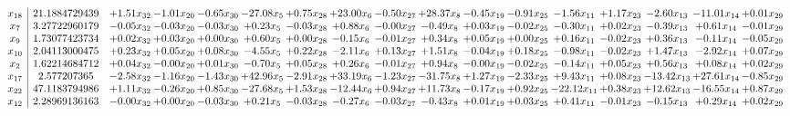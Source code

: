 \documentclass[9pt]{article}
\begin{document}
 \[\begin{array}{c| c c@{\hskip 2pt} c@{\hskip 2pt} c@{\hskip 2pt} c@{\hskip 2pt} c@{\hskip 2pt} c@{\hskip 2pt} c@{\hskip 2pt} c@{\hskip 2pt} c@{\hskip 2pt} c@{\hskip 2pt} c@{\hskip 2pt} c@{\hskip 2pt} c@{\hskip 2pt} c@{\hskip 2pt} c@{\hskip 2pt} }
 x_{18}   &  21.1884729439 & +  1.51 x_{32} & -1.01 x_{20} & -0.65 x_{30} & -27.08 x_{5} & +  0.75 x_{28} & + 23.00 x_{6} & -0.50 x_{27} & + 28.37 x_{8} & -0.45 x_{19} & -0.91 x_{25} & -1.56 x_{11} & +  1.17 x_{23} & -2.60 x_{13} & -11.01 x_{14} & +  0.01 x_{29}\\
 x_{7}   &  3.27722960179 & -0.05 x_{32} & -0.03 x_{20} & -0.03 x_{30} & +  0.23 x_{5} & -0.03 x_{28} & +  0.88 x_{6} & -0.00 x_{27} & -0.49 x_{8} & +  0.03 x_{19} & -0.02 x_{25} & -0.30 x_{11} & +  0.02 x_{23} & -0.39 x_{13} & +  0.61 x_{14} & -0.01 x_{29}\\
 x_{9}   &  1.73077423734 & +  0.02 x_{32} & +  0.03 x_{20} & +  0.00 x_{30} & +  0.60 x_{5} & +  0.00 x_{28} & -0.15 x_{6} & -0.01 x_{27} & +  0.34 x_{8} & +  0.05 x_{19} & +  0.00 x_{25} & +  0.16 x_{11} & -0.02 x_{23} & +  0.36 x_{13} & -0.11 x_{14} & -0.05 x_{29}\\
 x_{10}   &  2.04113000475 & +  0.23 x_{32} & +  0.05 x_{20} & +  0.08 x_{30} & -4.55 x_{5} & +  0.22 x_{28} & -2.11 x_{6} & +  0.13 x_{27} & +  1.51 x_{8} & -0.04 x_{19} & +  0.18 x_{25} & -0.98 x_{11} & -0.02 x_{23} & +  1.47 x_{13} & -2.92 x_{14} & +  0.07 x_{29}\\
 x_{2}   &  1.62214684712 & +  0.04 x_{32} & -0.00 x_{20} & +  0.01 x_{30} & -0.70 x_{5} & +  0.05 x_{28} & +  0.26 x_{6} & -0.01 x_{27} & +  0.94 x_{8} & -0.00 x_{19} & -0.02 x_{25} & -0.14 x_{11} & +  0.05 x_{23} & +  0.56 x_{13} & +  0.08 x_{14} & +  0.02 x_{29}\\
 x_{17}   &  2.577207365 & -2.58 x_{32} & -1.16 x_{20} & -1.43 x_{30} & + 42.96 x_{5} & -2.91 x_{28} & + 33.19 x_{6} & -1.23 x_{27} & -31.75 x_{8} & +  1.27 x_{19} & -2.33 x_{25} & +  9.43 x_{11} & +  0.08 x_{23} & -13.42 x_{13} & + 27.61 x_{14} & -0.85 x_{29}\\
 x_{22}   &  47.1183794986 & +  1.11 x_{32} & -0.26 x_{20} & +  0.85 x_{30} & -27.68 x_{5} & +  1.53 x_{28} & -12.44 x_{6} & +  0.94 x_{27} & + 11.73 x_{8} & -0.17 x_{19} & +  0.92 x_{25} & -22.12 x_{11} & +  0.38 x_{23} & + 12.62 x_{13} & -16.55 x_{14} & +  0.87 x_{29}\\
 x_{12}   &  2.28969136163 & -0.00 x_{32} & +  0.00 x_{20} & -0.03 x_{30} & +  0.21 x_{5} & -0.03 x_{28} & -0.27 x_{6} & -0.03 x_{27} & -0.43 x_{8} & +  0.01 x_{19} & +  0.03 x_{25} & +  0.41 x_{11} & -0.01 x_{23} & -0.15 x_{13} & +  0.29 x_{14} & +  0.02 x_{29}\\

\end{array}\]
\end{document}
